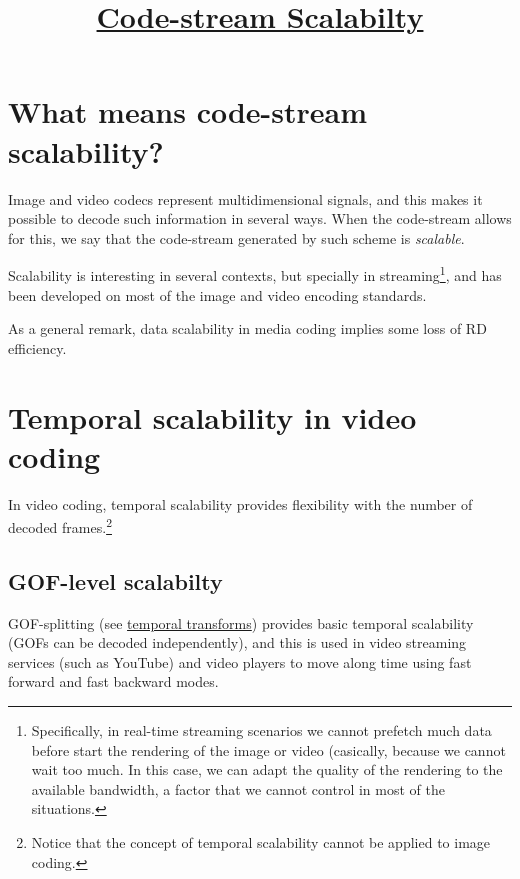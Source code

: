 



\title{\href{https://sistemas-multimedia.github.io/contents/data_scalability/}{Code-stream Scalabilty}}

\maketitle
\tableofcontents

\section{What means code-stream scalability?}

Image and video codecs represent multidimensional signals, and this
makes it possible to decode such information in several ways. When the
code-stream allows for this, we say that the code-stream generated by such
scheme is \emph{scalable}.

Scalability is interesting in several contexts, but specially in
streaming\footnote{Specifically, in real-time streaming scenarios we
  cannot prefetch much data before start the rendering of the image or
  video (casically, because we cannot wait too much. In this case, we
  can adapt the quality of the rendering to the available bandwidth, a
  factor that we cannot control in most of the situations.}, and has
been developed on most of the image and video encoding standards.

As a general remark, data scalability in media coding implies some
loss of RD efficiency.


\section{Temporal scalability in video coding~\cite{vruiz__video_scalability}}


In video coding, temporal scalability provides flexibility with the
number of decoded frames.\footnote{Notice that the concept of temporal
scalability cannot be applied to image coding.}

\subsection{GOF-level scalabilty}
GOF-splitting (see
\href{https://sistemas-multimedia.github.io/contents/temporal_transforms/}{temporal
  transforms}) provides basic temporal scalability (GOFs can be
decoded independently), and this is used in video streaming services
(such as YouTube) and video players to move along time using fast
forward and fast backward modes.
  

